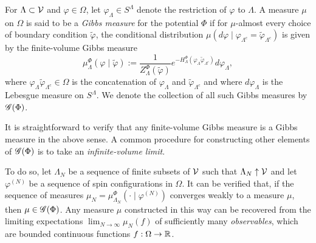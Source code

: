 For $\Lambda \subset \mathcal{V}$ and $\varphi \in \Omega$, let $\varphi_\Lambda \in S^\Lambda$
denote the restriction of $\varphi$ to $\Lambda$.
A measure $\mu$ on $\Omega$ is said to be a \emph{Gibbs measure} for the potential $\Phi$
if for $\mu$-almost
every choice of boundary condition $\tilde\varphi$, the conditional distribution
$\mu(d\varphi \mid \varphi_{\Lambda^c} = \tilde\varphi_{\Lambda^c})$ is given by the finite-volume Gibbs
measure
\begin{equation}
\mu^\Phi_\Lambda(\varphi \mid \tilde\varphi)
  :=
\frac{1}{Z^\Phi_\Lambda(\tilde\varphi)}
e^{-H^\Phi_\Lambda(\varphi_\Lambda \tilde\varphi_{\Lambda^c})}
d\varphi_\Lambda,
\end{equation}
where $\varphi_\Lambda\tilde\varphi_{\Lambda^c} \in \Omega$ is the concatenation of
$\varphi_\Lambda$ and $\tilde\varphi_{\Lambda^c}$
and where $d\varphi_\Lambda$ is the Lebesgue measure on $S^\Lambda$.
We denote the collection of all such Gibbs measures by $\mathscr{G}(\Phi)$.

It is straightforward to verify that any finite-volume Gibbs measure is a Gibbs measure
in the above sense. A common procedure for constructing other elements of $\mathscr{G}(\Phi)$
is to take an \emph{infinite-volume limit}.

To do so, let $\Lambda_N$ be a sequence of finite subsets of $\mathcal{V}$ such that
$\Lambda_N \uparrow \mathcal{V}$
and let $\varphi^{(N)}$ be a sequence of spin configurations in $\Omega$. It can be verified
that, if the sequence of measures $\mu_N = \mu^\Phi_{\Lambda_N}(\cdot \mid \varphi^{(N)})$ converges weakly
to a measure $\mu$, then $\mu\in\mathscr{G}(\Phi)$. Any measure $\mu$ constructed in this way
can be recovered from the limiting expectations $\lim_{N\to\infty} \mu_N(f)$ of sufficiently
many \emph{observables}, which are bounded continuous functions $f : \Omega \rightarrow {\mathbb R}$.

